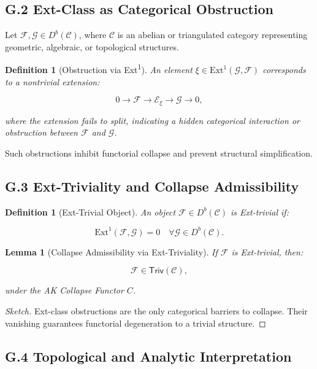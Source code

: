 \documentclass[11pt]{article}
\newtheorem{definition}[theorem]{Definition}
\newtheorem{lemma}[theorem]{Lemma}
\begin{document}
\subsection*{G.2 Ext-Class as Categorical Obstruction}

Let \( \mathcal{F}, \mathcal{G} \in D^b(\mathcal{C}) \), where \( \mathcal{C} \) is an abelian or triangulated category representing geometric, algebraic, or topological structures.

\begin{definition}[Obstruction via Ext\textsuperscript{1}]
An element \( \xi \in \mathrm{Ext}^1(\mathcal{G}, \mathcal{F}) \) corresponds to a nontrivial extension:

\[
0 \to \mathcal{F} \to \mathcal{E}_\xi \to \mathcal{G} \to 0,
\]

where the extension fails to split, indicating a hidden categorical interaction or obstruction between \( \mathcal{F} \) and \( \mathcal{G} \).
\end{definition}

Such obstructions inhibit functorial collapse and prevent structural simplification.

\subsection*{G.3 Ext-Triviality and Collapse Admissibility}

\begin{definition}[Ext-Trivial Object]
An object \( \mathcal{F} \in D^b(\mathcal{C}) \) is \emph{Ext-trivial} if:

\[
\mathrm{Ext}^1(\mathcal{F}, \mathcal{G}) = 0 \quad \forall \mathcal{G} \in D^b(\mathcal{C}).
\]
\end{definition}

\begin{lemma}[Collapse Admissibility via Ext-Triviality]
If \( \mathcal{F} \) is Ext-trivial, then:

\[
\mathcal{F} \in \mathsf{Triv}(\mathcal{C}),
\]

under the AK Collapse Functor \( C \).
\end{lemma}

\begin{proof}[Sketch]
Ext-class obstructions are the only categorical barriers to collapse. Their vanishing guarantees functorial degeneration to a trivial structure.
\end{proof}

\subsection*{G.4 Topological and Analytic Interpretation}
\end{document}

